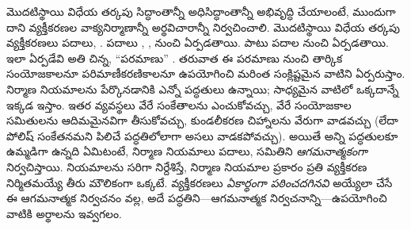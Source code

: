 \documentclass[../../../include/open-logic-section]{subfiles}
\begin{document}


మొదటిస్థాయి విధేయ తర్కపు సిద్ధాంతాన్నీ అధిసిద్ధాంతాన్నీ అభివృద్ధి
చేయాలంటే, ముందుగా దాని వ్యక్తీకరణల వాక్యనిర్మాణాన్నీ అర్థవిచారాన్నీ
నిర్వచించాలి. మొదటిస్థాయి విధేయ తర్కపు వ్యక్తీకరణలు పదాలు,
. పదాలు , ,
 నుంచి ఏర్పడతాయి. 
 పాటు పదాల నుంచి ఏర్పడతాయి. ఇలా ఏర్పడేవి అతి చిన్న, ``పరమాణు''
. తరువాత ఈ పరమాణు  నుంచి
తార్కిక సంయోజకాలనూ పరిమాణీకరణికాలనూ ఉపయోగించి మరింత సంక్లిష్టమైన
వాటిని ఏర్పరుస్తాం. నిర్మాణ నియమాలను పేర్కొనడానికి ఎన్నో పద్ధతులు
ఉన్నాయి; సాధ్యమైన వాటిలో ఒక్కదాన్నే ఇక్కడ ఇస్తాం. ఇతర వ్యవస్థలు వేరే
సంకేతాలను ఎంచుకోవచ్చు, వేరే సంయోజకాల సమితులను ఆదిమమైనవిగా
తీసుకోవచ్చు, కుండలీకరణ చిహ్నాలను వేరుగా వాడవచ్చు (లేదా పోలిష్
సంకేతనమని పిలిచే పద్ధతిలోలాగా అసలు వాడకపోవచ్చు). అయితే అన్ని
పద్ధతులకూ ఉమ్మడిగా ఉన్నది ఏమిటంటే, నిర్మాణ నియమాలు పదాలు,
 సమితిని \emph{ఆగమనాత్మకంగా} నిర్వచిస్తాయి. నియమాలను సరిగా నిర్దేశిస్తే,
నిర్మాణ నియమాల ప్రకారం ప్రతి వ్యక్తీకరణ నిర్మితమయ్యే తీరు మౌలికంగా
ఒక్కటే. వ్యక్తీకరణలు \emph{ఏకార్థంగా పఠించదగినవి} అయ్యేలా
చేసే ఈ ఆగమనాత్మక నిర్వచనం వల్ల, అదే పద్ధతిని---ఆగమనాత్మక
నిర్వచనాన్ని---ఉపయోగించి వాటికి అర్థాలను ఇవ్వగలం.
\end{document}

